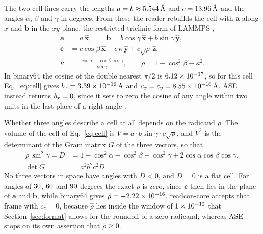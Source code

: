 \documentclass[preprint,12pt]{elsarticle}
\begin{document}
The two cell lines carry the lengths \(a=b\approx5.544\,\text{\AA}\) and \(c=13.96\,\text{\AA}\) and the angles \(\alpha\), \(\beta\) and \(\gamma\) in degrees.
From these the reader rebuilds the cell \cite{bekkerUnificationBoxShapes1997} with \(\mathbf{a}\) along \(x\) and \(\mathbf{b}\) in the \(xy\) plane, the restricted triclinic form of LAMMPS \cite{lammpsHowtoTriclinic2026},
\begin{equation}
\label{eq:cell}
\begin{aligned}
\mathbf{a}&=a\,\hat{\mathbf{x}},\qquad
\mathbf{b}=b\cos\gamma\,\hat{\mathbf{x}}+b\sin\gamma\,\hat{\mathbf{y}},\\
\mathbf{c}&=c\cos\beta\,\hat{\mathbf{x}}+c\,\kappa\,\hat{\mathbf{y}}+c\sqrt{\rho}\,\hat{\mathbf{z}},\\
\kappa&=\frac{\cos\alpha-\cos\beta\cos\gamma}{\sin\gamma},\qquad \rho=1-\cos^2\beta-\kappa^2.
\end{aligned}
\end{equation}
In binary64 the cosine of the double nearest \(\pi/2\) is \(\num{6.12e-17}\), so for this cell Eq.~\eqref{eq:cell} gives \(b_x=\num{3.39e-16}\,\text{\AA}\) and \(c_x=c_y=\num{8.55e-16}\,\text{\AA}\).
ASE~\wkAseVersion{} instead returns \(b_x=0\), since it sets to zero the cosine of any angle within two units in the last place of a right angle \cite{aseSource3290}.

Whether three angles describe a cell at all depends on the radicand \(\rho\).
The volume of the cell of Eq.~\eqref{eq:cell} is \(V=a\cdot b\sin\gamma\cdot c\sqrt{\rho}\), and \(V^2\) is the determinant of the Gram matrix \(G\) of the three vectors, so that
\begin{equation}
\label{eq:gram}
\begin{aligned}
\rho\,\sin^2\gamma = D &= 1-\cos^2\alpha-\cos^2\beta-\cos^2\gamma+2\cos\alpha\cos\beta\cos\gamma,\\
\det G &= a^2b^2c^2D .
\end{aligned}
\end{equation}
No three vectors in space have angles with \(D<0\), and \(D=0\) is a flat cell.
For angles of \(30\), \(60\) and \(90\) degrees the exact \(\rho\) is zero, since \(\mathbf{c}\) then lies in the plane of \(\mathbf{a}\) and \(\mathbf{b}\), while binary64 gives \(\hat\rho=\num{-2.22e-16}\).
readcon-core accepts that frame with \(c_z=0\), because \(\hat\rho\) lies inside the window of \(\num{1e-12}\) that Section~\ref{sec:format} allows for the roundoff of a zero radicand, whereas ASE stops on its own assertion that \(\hat\rho\ge0\).
\end{document}
